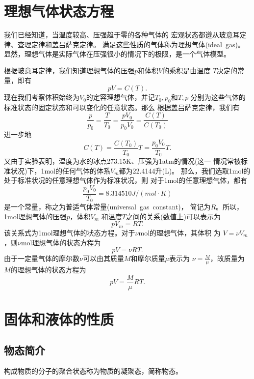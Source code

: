 \section{理想气体状态方程}
我们已经知道，当温度较高、压强趋于零的各种气体的
宏观状态都遵从玻意耳定律、查理定律和盖吕萨克定律。
满足这些性质的气体称为理想气体(ideal~gas)。
显然，理想气体是实际气体在压强很小的情况下的极限，是一个气体模型。

根据玻意耳定律，我们知道理想气体的压强$p$和体积$V$的乘积是由温度
$T$决定的常量，即有
\begin{equation}
    pV=C(T).
\end{equation}
现在我们考察体积始终为$V_0$的定容理想气体，并记$T_0,p_0$和$T,p$
分别为这些气体的标准状态的固定状态和可以变化的任意状态。那么 
根据盖吕萨克定律，我们有
\begin{equation}
    \frac{p}{p_0}=\frac{T}{T_0}=\frac{pV_0}{p_0V_0}=\frac{C(T)}{C(T_0)}
\end{equation}
进一步地
\begin{equation}
    C(T)=\frac{C(T_0)}{T_0}T=\frac{p_0V_0}{T_0}T.
\end{equation}
又由于实验表明，温度为水的冰点273.15K、压强为1atm的情况(这一
情况常被标准状况)下，1mol的任何气体的体系$V_m$都为22.4144升(L)。
那么，我们选取1mol的处于标准状况的任意理想气体作为标准状况，则
对于1mol的任意理想气体，都有
\begin{equation}
    \frac{p_0V_0}{T_0}=8.314510J/(mol\cdot K)
\end{equation}
是一个常量，称之为普适气体常量(universal~gas~constant)，
简记为$R$。所以，1mol理想气体的压强$p$，体积$V_m$
和温度$T$之间的关系(数值上)可以表示为
\begin{equation}
    pV_m=RT.
\end{equation}
该关系式为1mol理想气体的状态方程。对于$\nu$mol的理想气体，其体积
为 $V=\nu V_m$，则$\nu$mol理想气体的状态方程为
\begin{equation}
    pV=\nu RT.
\end{equation}
由于一定量气体的摩尔数$\nu$可以由其质量$M$和摩尔质量$\mu$表示为
$\nu=\frac{M}{\mu}$，故质量为$M$的理想气体的状态方程为
\begin{equation}
    pV=\frac{M}{\mu}RT.
\end{equation}
\section{固体和液体的性质}
\subsection{物态简介}
\begin{definition}
    构成物质的分子的聚合状态称为物质的凝聚态，简称物态。
\end{definition}


